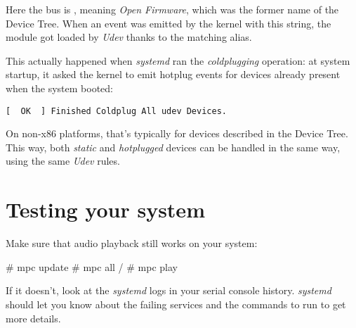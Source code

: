 Here the bus is , meaning {\em Open Firmware}, which
was the former name of the Device Tree. When an event was emitted by
the kernel with this  string, the  module
got loaded by {\em Udev} thanks to the matching alias.

This actually happened when {\em systemd} ran the {\em coldplugging}
operation: at system startup, it asked the kernel to emit hotplug events
for devices already present when the system booted:

\begin{verbatim}
[  OK  ] Finished Coldplug All udev Devices.
\end{verbatim}

On non-x86 platforms, that's typically for devices described in the
Device Tree. This way, both {\em static} and {\em hotplugged} devices
can be handled in the same way, using the same {\em Udev} rules.

\section{Testing your system}

Make sure that audio playback still works on your system:

\begin{bashinput}
# mpc update
# mpc all /
# mpc play
\end{bashinput}

If it doesn't, look at the {\em systemd} logs in your serial console
history. {\em systemd} should let you know about the failing services
and the commands to run to get more details.
